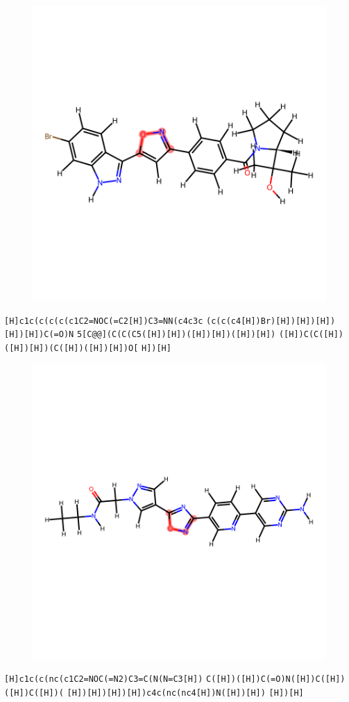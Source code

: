 \documentclass{article}
\begin{document}
\begin{figure}[ht]
\centering
    \includegraphics{mol204.png}
\end{figure}
\verb|[H]c1c(c(c(c(c1C2=NOC(=C2[H])C3=NN(c4c3c| \verb|(c(c(c4[H])Br)[H])[H])[H])[H])[H])C(=O)N| \verb|5[C@@](C(C(C5([H])[H])([H])[H])([H])[H])| \verb|([H])C(C([H])([H])[H])(C([H])([H])[H])O[| \verb|H])[H]|

\clearpage

\begin{figure}[ht]
\centering
    \includegraphics{mol205.png}
\end{figure}
\verb|[H]c1c(c(nc(c1C2=NOC(=N2)C3=C(N(N=C3[H])| \verb|C([H])([H])C(=O)N([H])C([H])([H])C([H])(| \verb|[H])[H])[H])[H])c4c(nc(nc4[H])N([H])[H])| \verb|[H])[H]|
\end{document}
